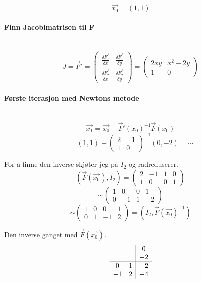$$\vec{x_0} = (1,1)$$



\paragraph{Finn Jacobimatrisen til F} \mbox{} \\
$$J = \vec{F}'
    = \begin{pmatrix}
      \frac{\delta\vec{F_1}}{\delta x} & \frac{\delta\vec{F_1}}{\delta y} \\
      \frac{\delta\vec{F_2}}{\delta x} & \frac{\delta\vec{F_2}}{\delta y}
      \end{pmatrix}
    = \begin{pmatrix}
      2xy & x^2-2y \\
      1   & 0
      \end{pmatrix}$$



\paragraph{Første iterasjon med Newtons metode} \mbox{} \\
$$\vec{x_1} = \vec{x_0} - \vec{F}'(x_0)^{-1}\vec{F}(x_0)$$
$$ = (1,1) - \begin{pmatrix}2&-1\\1&0\end{pmatrix}^{-1} (0,-2) = \cdots$$

For å finne den inverse skjøter jeg på $I_2$ og radreduserer.
$$(\vec{F}(\vec{x_0}),I_2) =
  \begin{pmatrix} 2 & -1 & 1 & 0 \\ 1 & 0 & 0 & 1 \end{pmatrix}$$
$$\sim \begin{pmatrix} 1 & 0 & 0 & 1 \\ 0 & -1 & 1 & -2 \end{pmatrix}$$
$$\sim \begin{pmatrix} 1 & 0 & 0 & 1 \\ 0 & 1 & -1 & 2 \end{pmatrix}
  = (I_2, \vec{F}(\vec{x_0})^{-1})$$

Den inverse ganget med $\vec{F}(\vec{x_0})$.
$$\begin{array}{c c|c}
     &   &  0 \\
     &   & -2 \\
  \hline
   0 & 1 & -2 \\
  -1 & 2 & -4
  \end{array}$$


